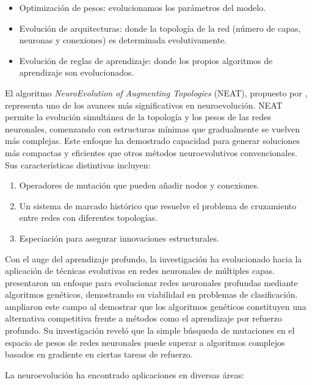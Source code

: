 \begin{itemize}
    \item Optimización de pesos: evolucionamos los parámetros del modelo.
    \item Evolución de arquitecturas: donde la topología de la red (número de capas, neuronas y conexiones) es determinada evolutivamente.
    \item Evolución de reglas de aprendizaje: donde los propios algoritmos de aprendizaje son evolucionados.
\end{itemize}




El algoritmo \textit{NeuroEvolution of Augmenting Topologies} (NEAT), propuesto por \cite{Stanley2002}, representa uno de los avances más significativos en neuroevolución. NEAT permite la evolución simultánea de la topología y los pesos de las redes neuronales, comenzando con estructuras mínimas que gradualmente se vuelven más complejas. Este enfoque ha demostrado capacidad para generar soluciones más compactas y eficientes que otros métodos neuroevolutivos convencionales. Sus características distintivas incluyen:

\begin{enumerate}
    \item Operadores de mutación que pueden añadir nodos y conexiones.
    \item Un sistema de marcado histórico que resuelve el problema de cruzamiento entre redes con diferentes topologías.
    \item Especiación para asegurar innovaciones estructurales.
\end{enumerate}





Con el auge del aprendizaje profundo, la investigación ha evolucionado hacia la aplicación de técnicas evolutivas en redes neuronales de múltiples capas. \cite{David2014} presentaron un enfoque para evolucionar redes neuronales profundas mediante algoritmos genéticos, demostrando su viabilidad en problemas de clasificación. \cite{Such2017} ampliaron este campo al demostrar que los algoritmos genéticos constituyen una alternativa competitiva frente a métodos como el aprendizaje por refuerzo profundo. Su investigación reveló que la simple búsqueda de mutaciones en el espacio de pesos de redes neuronales puede superar a algoritmos complejos basados en gradiente en ciertas tareas de refuerzo. 



La neuroevolución ha encontrado aplicaciones en diversas áreas:



